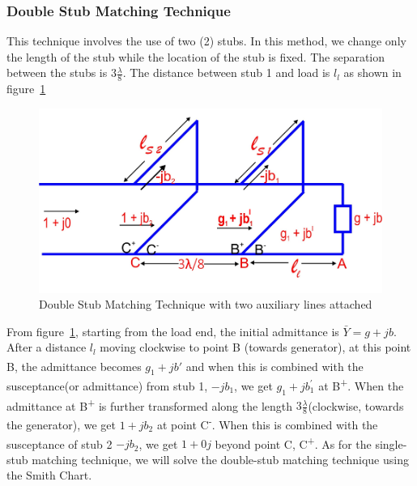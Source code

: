 \subsubsection{Double Stub Matching Technique}
This technique involves the use of two (2) stubs. In this method, we change only the length of the stub while the location of the stub is fixed. The separation between the stubs is $3\frac{\lambda}{8}$. The distance between stub 1 and load is $l_l$ as shown in figure~\ref{fig:fig12}
\begin{figure}[h]
\centering
\includegraphics[width=1\linewidth]{./graphics/double_stub}
\caption{Double Stub Matching Technique with two auxiliary lines attached}
\label{fig:fig12}
\end{figure}
From figure~\ref{fig:fig12}, starting from the load end, the initial admittance is $\bar{Y} = g + jb$. After a distance $l_l$ moving clockwise to point B (towards generator), at this point B\textsuperscript{\textemdash}, the admittance becomes $g_1 + jb'$ and when this is combined with the susceptance(or admittance) from stub 1, $-jb_1$, we get $g_1 +jb_1^{'}$ at B\textsuperscript{+}. When the admittance at B\textsuperscript{+} is further transformed along the length $3\frac{\lambda}{8}$(clockwise, towards the generator), we get $1 + jb_2$ at point C\textsuperscript{-}. When this is combined with the susceptance of stub 2 $-jb_2$, we get $1 + 0j$ beyond point C, C\textsuperscript{+}. As for the single-stub matching technique, we will solve the double-stub matching technique using the Smith Chart.
